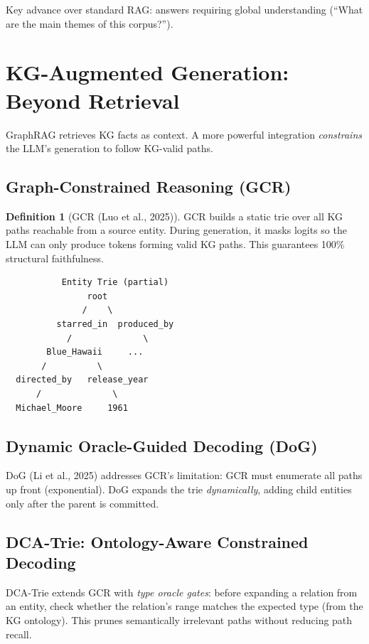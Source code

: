 \documentclass[11pt,a4paper,oneside,openany]{book}
\theoremstyle{definition}
\newtheorem{definition}{Definition}[chapter]
\theoremstyle{plain}
\theoremstyle{remark}
\begin{document}
Key advance over standard RAG: answers requiring global understanding (``What are the main themes of this corpus?'').

\section{KG-Augmented Generation: Beyond Retrieval}\label{sec:kg-constrained}

GraphRAG retrieves KG facts as context. A more powerful integration \emph{constrains} the LLM's generation to follow KG-valid paths.

\subsection{Graph-Constrained Reasoning (GCR)}

\begin{definition}[GCR (Luo et al., 2025)]
	GCR builds a static trie over all KG paths reachable from a source entity. During generation, it masks logits so the LLM can only produce tokens forming valid KG paths. This guarantees 100\% structural faithfulness.
\end{definition}

\begin{verbatim}
           Entity Trie (partial)
                root
               /    \
          starred_in  produced_by
            /              \
        Blue_Hawaii     ...
       /          \
  directed_by   release_year
      /              \
  Michael_Moore     1961
\end{verbatim}

\subsection{Dynamic Oracle-Guided Decoding (DoG)}

DoG (Li et al., 2025) addresses GCR's limitation: GCR must enumerate all paths up front (exponential). DoG expands the trie \emph{dynamically}, adding child entities only after the parent is committed.

\subsection{DCA-Trie: Ontology-Aware Constrained Decoding}

DCA-Trie extends GCR with \emph{type oracle gates}: before expanding a relation from an entity, check whether the relation's range matches the expected type (from the KG ontology). This prunes semantically irrelevant paths without reducing path recall.
\end{document}
